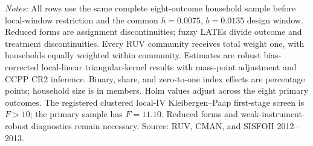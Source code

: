 \parbox{0.97\linewidth}{\footnotesize \textit{Notes:} All rows use the same complete eight-outcome household sample before local-window restriction and the common \(h=0.0075\), \(b=0.0135\) design window. Reduced forms are assignment discontinuities; fuzzy LATEs divide outcome and treatment discontinuities. Every RUV community receives total weight one, with households equally weighted within community. Estimates are robust bias-corrected local-linear triangular-kernel results with mass-point adjustment and CCPP CR2 inference. Binary, share, and zero-to-one index effects are percentage points; household size is in members. Holm values adjust across the eight primary outcomes. The registered clustered local-IV Kleibergen--Paap first-stage screen is \(F>10\); the primary sample has \(F=11.10\). Reduced forms and weak-instrument-robust diagnostics remain necessary. Source: RUV, CMAN, and SISFOH 2012--2013.}
\par{}\par\endgroup
